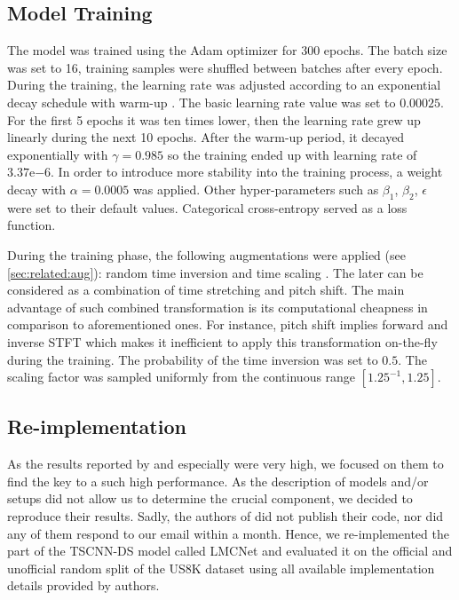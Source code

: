 \documentclass[a4paper,conference]{IEEEtran}
\begin{document}
\subsection{Model Training} \label{ssec:model_training}

The model was trained using the Adam \cite{kingma2014adam} optimizer for 300 epochs.
The batch size was set to 16, training samples were shuffled between batches after every epoch.
During the training, the learning rate was adjusted according to an exponential decay schedule with warm-up \cite{goyal2017warmup}.
The basic learning rate value was set to $0.00025$.
For the first 5 epochs it was ten times lower, then the learning rate grew up linearly during the next 10 epochs.
After the warm-up period, it decayed exponentially with $\gamma = 0.985$ so the training ended up with learning rate of $3.37\mathrm{e}{-6}$.
In order to introduce more stability into the training process, a weight decay with $\alpha = 0.0005$ \cite{krizhevsky2012alexnet} was applied.
Other hyper-parameters \cite{kingma2014adam} such as $\beta_1$, $\beta_2$, $\epsilon$ were set to their default values.
Categorical cross-entropy served as a loss function.

During the training phase, the following augmentations were applied (see \autoref{sec:related:aug}): random time inversion and time scaling  \cite{tokozume2017envnetv2}.
The later can be considered as a combination of time stretching and pitch shift.
The main advantage of such combined transformation is its computational cheapness in comparison to aforementioned ones.
For instance, pitch shift implies forward and inverse STFT which makes it inefficient to apply this transformation on-the-fly during the training.
The probability of the time inversion was set to $0.5$.
The scaling factor was sampled uniformly from the continuous range $[1.25^{-1}, 1.25]$.

\subsection{Re-implementation} \label{ssec:reimpl}

As the results reported by \cite{wang2019tfnet} and especially \cite{su2019tscnnds} were very high, we focused on them to find the key to a such high performance.
As the description of models and\:/\:or setups did not allow us to determine the crucial component, we decided to reproduce their results.
Sadly, the authors of \cite{su2019tscnnds} did not publish their code, nor did any of them respond to our email within a month.
Hence, we re-implemented the part of the \mbox{TSCNN-DS} model called \mbox{LMCNet} and evaluated it on the official \cite{salamon2014us8k} and unofficial random split of the US8K dataset using all available implementation details provided by authors.
\end{document}
